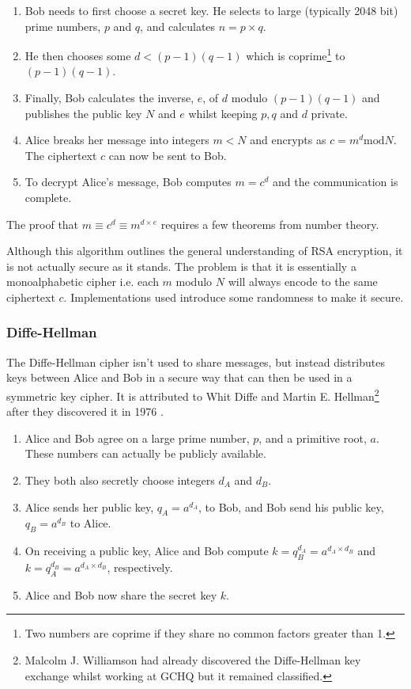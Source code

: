 \begin{enumerate}
	\item Bob needs to first choose a secret key. He selects to large (typically 2048 bit) prime numbers, $p$ and $q$, and calculates $n = p \times q$.
	\item He then chooses some $d < (p-1)(q-1)$ which is coprime\footnote{Two numbers are coprime if they share no common factors greater than 1.} to $(p-1)(q-1)$.
	\item Finally, Bob calculates the inverse, $e$, of $d$ modulo $(p-1)(q-1)$ and publishes the public key $N$ and $e$ whilst keeping $p,q$ and $d$ private.
	\item Alice breaks her message into integers $m < N$ and encrypts as $c = m^d \mathrm{ mod } N$. The ciphertext $c$ can now be sent to Bob.
	\item To decrypt Alice's message, Bob computes $m = c^d$ and the communication is complete. 
\end{enumerate}   

The proof that $m \equiv c^d \equiv m^{d\times e}$ requires a few theorems from number theory. 

Although this algorithm outlines the general understanding of RSA encryption, it is not actually secure as it stands. The problem is that it is essentially a monoalphabetic cipher i.e. each $m$ modulo $N$ will always encode to the same ciphertext $c$. Implementations used introduce some randomness to make it secure.


\subsubsection*{Diffe-Hellman}

The Diffe-Hellman cipher isn't used to share messages, but instead distributes keys between Alice and Bob in a secure way that can then be used in a symmetric key cipher. It is attributed to Whit Diffe and Martin E. Hellman\footnote{Malcolm J. Williamson had already discovered the Diffe-Hellman key exchange whilst working at GCHQ but it remained classified.} after they discovered it in 1976 \cite{}.

\begin{enumerate}
	\item Alice and Bob agree on a large prime number, $p$, and a primitive root, $a$. These numbers can actually be publicly available.
	\item They both also secretly choose integers $d_A$ and $d_B$.
	\item Alice sends her public key, $q_A = a^{d_A}$, to Bob, and Bob send his public key, $q_B = a^{d_B}$ to Alice.
	\item On receiving a public key, Alice and Bob compute $k = q_B^{d_A} = a^{d_A\times d_B}$ and $k = q_A^{d_B} = a^{d_A\times d_B}$, respectively.
	\item Alice and Bob now share the secret key $k$.
\end{enumerate}

